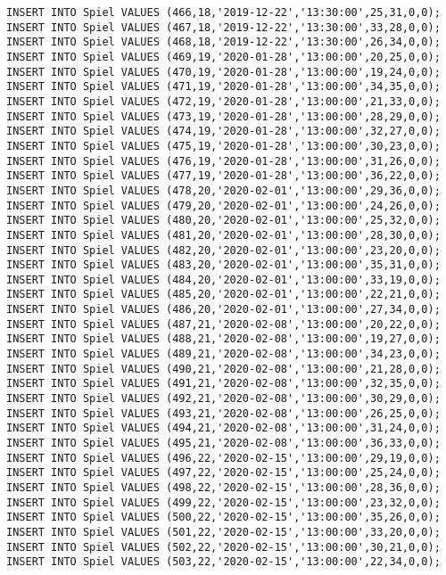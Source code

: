 \documentclass{lehramt-informatik-aufgabe}
\begin{document}
\begin{verbatim}
INSERT INTO Spiel VALUES (466,18,'2019-12-22','13:30:00',25,31,0,0);
INSERT INTO Spiel VALUES (467,18,'2019-12-22','13:30:00',33,28,0,0);
INSERT INTO Spiel VALUES (468,18,'2019-12-22','13:30:00',26,34,0,0);
INSERT INTO Spiel VALUES (469,19,'2020-01-28','13:00:00',20,25,0,0);
INSERT INTO Spiel VALUES (470,19,'2020-01-28','13:00:00',19,24,0,0);
INSERT INTO Spiel VALUES (471,19,'2020-01-28','13:00:00',34,35,0,0);
INSERT INTO Spiel VALUES (472,19,'2020-01-28','13:00:00',21,33,0,0);
INSERT INTO Spiel VALUES (473,19,'2020-01-28','13:00:00',28,29,0,0);
INSERT INTO Spiel VALUES (474,19,'2020-01-28','13:00:00',32,27,0,0);
INSERT INTO Spiel VALUES (475,19,'2020-01-28','13:00:00',30,23,0,0);
INSERT INTO Spiel VALUES (476,19,'2020-01-28','13:00:00',31,26,0,0);
INSERT INTO Spiel VALUES (477,19,'2020-01-28','13:00:00',36,22,0,0);
INSERT INTO Spiel VALUES (478,20,'2020-02-01','13:00:00',29,36,0,0);
INSERT INTO Spiel VALUES (479,20,'2020-02-01','13:00:00',24,26,0,0);
INSERT INTO Spiel VALUES (480,20,'2020-02-01','13:00:00',25,32,0,0);
INSERT INTO Spiel VALUES (481,20,'2020-02-01','13:00:00',28,30,0,0);
INSERT INTO Spiel VALUES (482,20,'2020-02-01','13:00:00',23,20,0,0);
INSERT INTO Spiel VALUES (483,20,'2020-02-01','13:00:00',35,31,0,0);
INSERT INTO Spiel VALUES (484,20,'2020-02-01','13:00:00',33,19,0,0);
INSERT INTO Spiel VALUES (485,20,'2020-02-01','13:00:00',22,21,0,0);
INSERT INTO Spiel VALUES (486,20,'2020-02-01','13:00:00',27,34,0,0);
INSERT INTO Spiel VALUES (487,21,'2020-02-08','13:00:00',20,22,0,0);
INSERT INTO Spiel VALUES (488,21,'2020-02-08','13:00:00',19,27,0,0);
INSERT INTO Spiel VALUES (489,21,'2020-02-08','13:00:00',34,23,0,0);
INSERT INTO Spiel VALUES (490,21,'2020-02-08','13:00:00',21,28,0,0);
INSERT INTO Spiel VALUES (491,21,'2020-02-08','13:00:00',32,35,0,0);
INSERT INTO Spiel VALUES (492,21,'2020-02-08','13:00:00',30,29,0,0);
INSERT INTO Spiel VALUES (493,21,'2020-02-08','13:00:00',26,25,0,0);
INSERT INTO Spiel VALUES (494,21,'2020-02-08','13:00:00',31,24,0,0);
INSERT INTO Spiel VALUES (495,21,'2020-02-08','13:00:00',36,33,0,0);
INSERT INTO Spiel VALUES (496,22,'2020-02-15','13:00:00',29,19,0,0);
INSERT INTO Spiel VALUES (497,22,'2020-02-15','13:00:00',25,24,0,0);
INSERT INTO Spiel VALUES (498,22,'2020-02-15','13:00:00',28,36,0,0);
INSERT INTO Spiel VALUES (499,22,'2020-02-15','13:00:00',23,32,0,0);
INSERT INTO Spiel VALUES (500,22,'2020-02-15','13:00:00',35,26,0,0);
INSERT INTO Spiel VALUES (501,22,'2020-02-15','13:00:00',33,20,0,0);
INSERT INTO Spiel VALUES (502,22,'2020-02-15','13:00:00',30,21,0,0);
INSERT INTO Spiel VALUES (503,22,'2020-02-15','13:00:00',22,34,0,0);

\end{verbatim}
\end{document}
